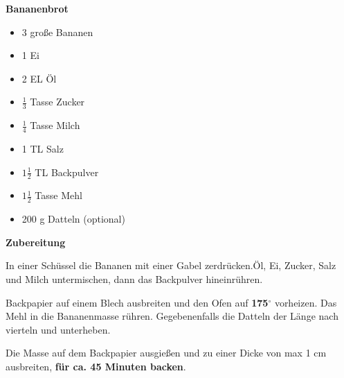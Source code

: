 


\parindent0pt	

\pagestyle{empty}


\textbf{{\LARGE Bananenbrot}}%

\hrulefill
\vspace*{\fill}
\begin{multicols}{2}	


\begin{itemize}
\item  3 große Bananen 
\item  1 Ei 
\item  2 EL Öl 
\item $\frac{1}{3}$ Tasse Zucker 
\item  $\frac{1}{4}$ Tasse Milch 
\item  1 TL Salz 
\item $1\frac{1}{2}$ TL Backpulver 
\item $1\frac{1}{2}$ Tasse Mehl
\item 200 g Datteln (optional)
\end{itemize}
\vfill									
\end{multicols}

\vspace{2cm}			%
\begin{center}			%

\end{center}


\vfill
\newpage
\textbf{{\LARGE Zubereitung}}%

\hrulefill

\vspace*{\fill}
\begin{multicols}{2}


In einer Schüssel die Bananen mit einer Gabel  zerdrücken.\newline Öl, Ei, Zucker, Salz und Milch untermischen, dann das Backpulver 
hineinrühren.\newline

Backpapier auf einem Blech ausbreiten und den Ofen auf \textbf{175$^\circ$} vorheizen. 
Das Mehl in die Bananenmasse rühren.\newline 
Gegebenenfalls die Datteln der Länge nach vierteln und unterheben.\newline

Die Masse auf dem Backpapier ausgießen und zu einer Dicke von max 1 cm ausbreiten,
\textbf{für ca. 45 Minuten backen}. 



\end{multicols}
\vfill
